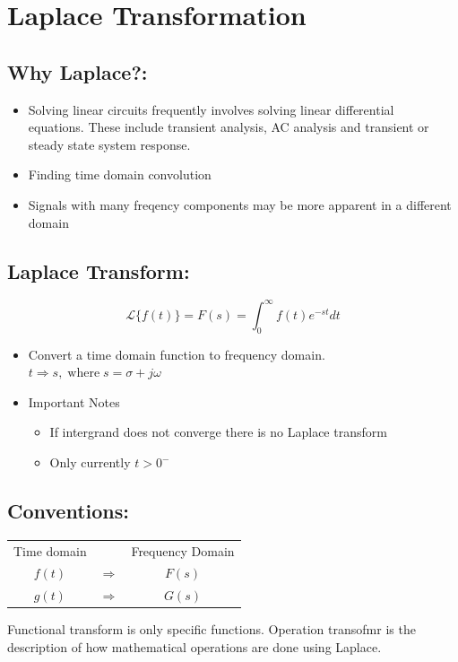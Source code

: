\documentclass[a5paper]{article}
\newcommand{\Lap}{\mathcal{L}}
\begin{document}
	\section{Laplace Transformation}
	\subsection{Why Laplace?:}
	\begin{itemize}
		\item Solving linear circuits frequently involves solving linear differential \\equations. These include transient analysis, AC analysis and transient or steady state system response.
		\item Finding time domain convolution
		\item Signals with many freqency components may be more apparent in a different domain
	\end{itemize}
	\subsection{Laplace Transform:}
	$$\Lap\{f(t)\}=F(s)=\int^{\infty}_{0}f(t)e^{-st}dt$$
	\begin{itemize}
		\item Convert a time domain function to frequency domain. $t\Rightarrow s,\;\text{where}\;s=\sigma+j\omega$
		\item Important Notes
		\begin{itemize}
			\item If intergrand does not converge there is no Laplace transform
			\item Only currently $t>0^{-}$
		\end{itemize}
	\end{itemize}
	\subsection{Conventions:}
	\begin{center}
	\begin{tabular}{ c c c }
		Time domain & & Frequency Domain\\
		$f(t)$ & $\Rightarrow$ & $F(s)$\\
		$g(t)$ & $\Rightarrow$ & $G(s)$
	\end{tabular}
	\end{center}
	Functional transform is only specific functions. Operation transofmr is the description of how mathematical operations are done using Laplace.
\end{document}
